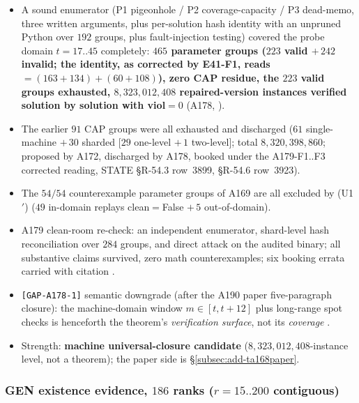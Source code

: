 \begin{itemize}
\item A sound enumerator (P1 pigeonhole / P2 coverage-capacity / P3
dead-memo, three written arguments, plus per-solution hash identity with an
unpruned Python over $192$ groups, plus fault-injection testing) covered the
probe domain $t=17..45$ completely: \textbf{$465$ parameter groups ($223$
valid $+\,242$ invalid; the identity, as corrected by E41-F1, reads
$=(163+134)+(60+108)$), zero CAP residue, the $223$ valid groups exhausted,
$8{,}323{,}012{,}408$ repaired-version instances verified solution by
solution with viol$=0$} (A178, ).
\item The earlier $91$ CAP groups were all exhausted and discharged ($61$
single-machine $+\,30$ sharded [$29$ one-level $+\,1$ two-level]; total
$8{,}320{,}398{,}860$; proposed by A172, discharged by A178, booked under the
A179-F1..F3 corrected reading, STATE \S R-54.3 row~3899, \S R-54.6 row~3923).
\item The $54/54$ counterexample parameter groups of A169 are all excluded by
(U1$'$) ($49$ in-domain replays clean$=$False $+\,5$ out-of-domain).
\item A179 clean-room re-check: an independent enumerator, shard-level hash
reconciliation over $284$ groups, and direct attack on the audited binary;
all substantive claims survived, zero math counterexamples; six booking
errata carried with citation .
\item \texttt{[GAP-A178-1]} semantic downgrade (after the A190 paper
five-paragraph closure): the machine-domain window $m\in[t,t+12]$ plus
long-range spot checks is henceforth the theorem's \emph{verification
surface}, not its \emph{coverage} .
\item Strength: \textbf{machine universal-closure candidate} ($8{,}323{,}012{,}408$-instance level, not a theorem); the paper side is
\S\ref{subsec:add-ta168paper}.
\end{itemize}

\subsubsection{GEN existence evidence, $186$ ranks ($r=15..200$
contiguous) \tierMCA}\label{subsubsec:add-gen186}

